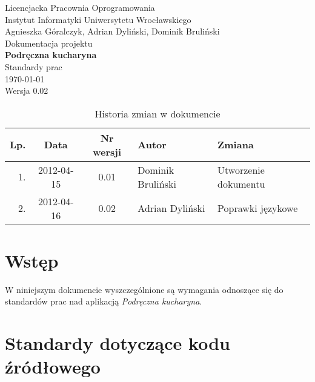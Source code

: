 \documentclass[12pt,leqno, twoside]{mwart}
\begin{document}
\thispagestyle{empty}
\begin{center}
Licencjacka Pracownia Oprogramowania \\ Instytut
Informatyki Uniwersytetu Wrocławskiego \\
\vspace{4cm}
\Large Agnieszka Góralczyk, Adrian Dyliński, Dominik Bruliński \\
\vspace{0.5cm}
\huge Dokumentacja projektu\\ \textbf{Podręczna kucharyna}\\ \Large Standardy prac\\
\vspace{1cm}
\normalsize \today \\
\vspace{2cm}
\normalsize Wersja 0.02
\end{center}

\newpage


\begin{table}
	\centering
	\caption{Historia zmian w dokumencie}
		\begin{tabular}{|r|c|c|l|l|}
		\hline
		Lp. & Data       & Nr wersji & Autor               & Zmiana \\ \hline
		1.  & 2012-04-15 & 0.01 & Dominik Bruliński & Utworzenie dokumentu \\ \hline
		2.  & 2012-04-16 & 0.02 & Adrian Dyliński & Poprawki językowe \\ \hline
		\end{tabular}
\end{table}

\newpage

\tableofcontents
\newpage

\section{Wstęp}
	W niniejszym dokumencie wyszczególnione są wymagania odnoszące się do standardów prac
	nad aplikacją \emph{Podręczna kucharyna}.

	\section{Standardy dotyczące kodu źródłowego}
	
\end{document}
